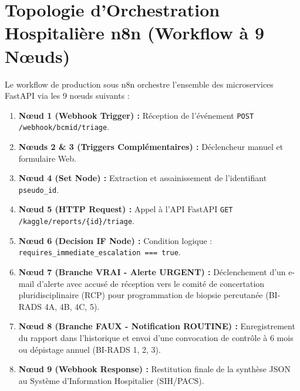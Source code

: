 \documentclass[11pt,a4paper]{article}
\begin{document}
\section{Topologie d'Orchestration Hospitalière n8n (Workflow à 9 N{\oe}uds)}
\label{annex:n8n}
Le workflow de production sous n8n orchestre l'ensemble des microservices FastAPI via les 9 n{\oe}uds suivants :
\begin{enumerate}
    \item \textbf{N{\oe}ud 1 (Webhook Trigger) :} Réception de l'événement \texttt{POST /webhook/bcmid/triage}.
    \item \textbf{N{\oe}uds 2 \& 3 (Triggers Complémentaires) :} Déclencheur manuel et formulaire Web.
    \item \textbf{N{\oe}ud 4 (Set Node) :} Extraction et assainissement de l'identifiant \texttt{pseudo\_id}.
    \item \textbf{N{\oe}ud 5 (HTTP Request) :} Appel à l'API FastAPI \texttt{GET /kaggle/reports/\{id\}/triage}.
    \item \textbf{N{\oe}ud 6 (Decision IF Node) :} Condition logique : \texttt{requires\_immediate\_escalation === true}.
    \item \textbf{N{\oe}ud 7 (Branche VRAI - Alerte URGENT) :} Déclenchement d'un e-mail d'alerte avec accusé de réception vers le comité de concertation pluridisciplinaire (RCP) pour programmation de biopsie percutanée (BI-RADS 4A, 4B, 4C, 5).
    \item \textbf{N{\oe}ud 8 (Branche FAUX - Notification ROUTINE) :} Enregistrement du rapport dans l'historique et envoi d'une convocation de contrôle à 6 mois ou dépistage annuel (BI-RADS 1, 2, 3).
    \item \textbf{N{\oe}ud 9 (Webhook Response) :} Restitution finale de la synthèse JSON au Système d'Information Hospitalier (SIH/PACS).
\end{enumerate}
\end{document}
